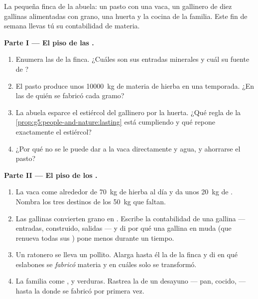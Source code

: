 \begin{problem}\label{pb:g6:matter-from-food:1}
La pequeña finca de la abuela: un pasto con una vaca, un gallinero de
diez gallinas alimentadas con grano, una huerta y la cocina de la
familia. Este fin de semana llevas tú su contabilidad de materia.

\medskip\noindent\textbf{Parte I --- El piso de las .}
\begin{enumerate}
  \item Enumera las  de la finca. ¿Cuáles son sus entradas
        minerales y cuál su fuente de ?
  \item El pasto produce unos \qty{10000}{kg} de materia de hierba en
        una temporada. ¿En las  de quién se fabricó cada gramo?
  \item La abuela esparce el estiércol del gallinero por la huerta.
        ¿Qué regla de la \cref{prop:g5:people-and-nature:lasting} está
        cumpliendo y qué repone exactamente el estiércol?
  \item ¿Por qué no se le puede dar a la vaca directamente  y agua, y ahorrarse el pasto?
\end{enumerate}

\medskip\noindent\textbf{Parte II --- El piso de los .}
\begin{enumerate}[resume]
  \item La vaca come alrededor de \qty{70}{kg} de hierba al día y da
        unos \qty{20}{kg} de . Nombra los tres destinos de los
        \qty{50}{kg} que faltan.
  \item Las gallinas convierten grano en . Escribe la
        contabilidad de una gallina --- entradas, construido, salidas
        --- y di por qué una gallina en muda (que renueva todas sus
        ) pone menos  durante un tiempo.
  \item Un ratonero se lleva un pollito. Alarga hasta él la  de la finca y di en qué eslabones se \emph{fabricó}
        materia y en cuáles solo se transformó.
  \item La familia come ,  y verduras. Rastrea la  de un desayuno --- pan,  cocido,  --- hasta
        la  donde se fabricó por primera vez.
\end{enumerate}


\end{problem}
